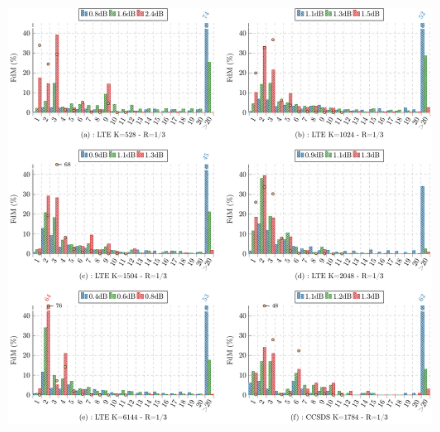 \begin{figure}[!ht]
	\centering
	\includegraphics[width=\textwidth]{main/ch3_fig/be/tikz/be.pdf}
	\caption{ \label{fig:be}}
\end{figure}


